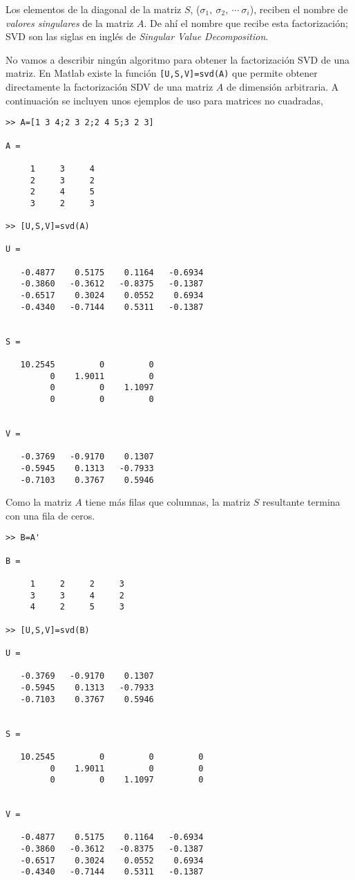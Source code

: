 Los elementos de la diagonal de la matriz $S$, ($\sigma_1, \ \sigma_2, \  \cdots \ \sigma_i$), reciben el nombre de \emph{valores singulares} de la matriz $A$. De ahí el nombre que recibe esta factorización; SVD son las siglas en inglés de \emph{Singular Value Decomposition}.

No vamos a describir ningún algoritmo para obtener la factorización SVD de una matriz. En Matlab existe la función \texttt{[U,S,V]=svd(A)} que permite obtener directamente la factorización SDV de una matriz $A$ de dimensión arbitraria. A continuación se incluyen unos ejemplos de uso para matrices no cuadradas,

\begin{verbatim}
>> A=[1 3 4;2 3 2;2 4 5;3 2 3]

A =

     1     3     4
     2     3     2
     2     4     5
     3     2     3

>> [U,S,V]=svd(A)

U =

   -0.4877    0.5175    0.1164   -0.6934
   -0.3860   -0.3612   -0.8375   -0.1387
   -0.6517    0.3024    0.0552    0.6934
   -0.4340   -0.7144    0.5311   -0.1387


S =

   10.2545         0         0
         0    1.9011         0
         0         0    1.1097
         0         0         0


V =

   -0.3769   -0.9170    0.1307
   -0.5945    0.1313   -0.7933
   -0.7103    0.3767    0.5946
\end{verbatim}

Como la matriz $A$ tiene más filas que columnas, la matriz $S$ resultante termina con una fila de ceros.

\begin{verbatim}
>> B=A'

B =

     1     2     2     3
     3     3     4     2
     4     2     5     3

>> [U,S,V]=svd(B)

U =

   -0.3769   -0.9170    0.1307
   -0.5945    0.1313   -0.7933
   -0.7103    0.3767    0.5946


S =

   10.2545         0         0         0
         0    1.9011         0         0
         0         0    1.1097         0


V =

   -0.4877    0.5175    0.1164   -0.6934
   -0.3860   -0.3612   -0.8375   -0.1387
   -0.6517    0.3024    0.0552    0.6934
   -0.4340   -0.7144    0.5311   -0.1387
   
\end{verbatim}

